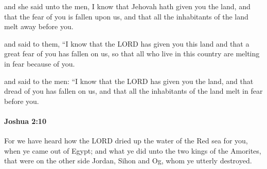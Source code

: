 			\begin{versebox}
					\item[BHS] 
					\item[ASV] and she said unto the men, I know that Jehovah hath given you the land, and that the fear of you is fallen upon us, and that all the inhabitants of the land melt away before you.
					\item[NIV] and said to them, “I know that the LORD has given you this land and that a great fear of you has fallen on us, so that all who live in this country are melting in fear because of you.
					\item[NRSV] and said to the men: “I know that the LORD has given you the land, and that dread of you has fallen on us, and that all the inhabitants of the land melt in fear before you.
			\end{versebox}

		\paragraph{Joshua 2:10} %
			\label{JOSHUA-2-10}

			For we have heard how the LORD dried up the water of the Red sea for you, when ye came out of Egypt; and what ye did unto the two kings of the Amorites, that were on the other side Jordan, Sihon and Og, whom ye utterly destroyed.


